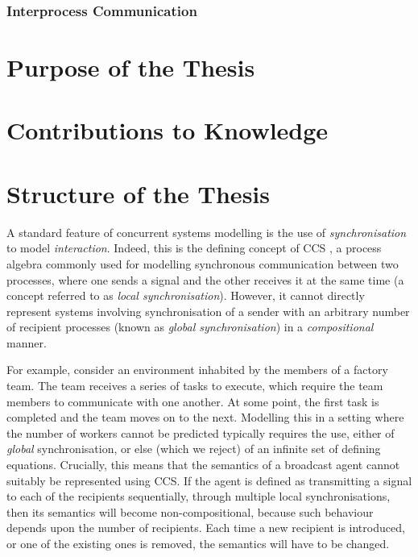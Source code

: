 \subsubsection{Interprocess Communication}




\section{Purpose of the Thesis}

\section{Contributions to Knowledge}

\section{Structure of the Thesis}

A standard feature of concurrent systems modelling is the use of
\emph{synchronisation} to model \emph{interaction}. Indeed, this is the
defining concept of CCS \cite{milner:ccs}, a process algebra commonly
used for modelling synchronous communication between two processes,
where one sends a signal and the other receives it at the same time (a
concept referred to as \emph{local synchronisation}).  However, it
cannot directly represent systems involving synchronisation of a sender
with an arbitrary number of recipient processes (known as \emph{global
synchronisation}) in a \emph{compositional} manner.  

For example, consider an environment inhabited by the members of a
factory team. The team receives a series of tasks to execute, which
require the team members to communicate with one another. At some point,
the first task is completed and the team moves on to the next. Modelling
this in a setting where the number of workers cannot be predicted
typically requires the use, either of \emph{global} synchronisation, or
else (which we reject) of an infinite set of defining equations.
Crucially, this means that the semantics of a broadcast agent cannot
suitably be represented using CCS.  If the agent is defined as
transmitting a signal to each of the recipients sequentially, through
multiple local synchronisations, then its semantics will become
non-compositional, because such behaviour depends upon the number of
recipients.  Each time a new recipient is introduced, or one of the
existing ones is removed, the semantics will have to be changed.

